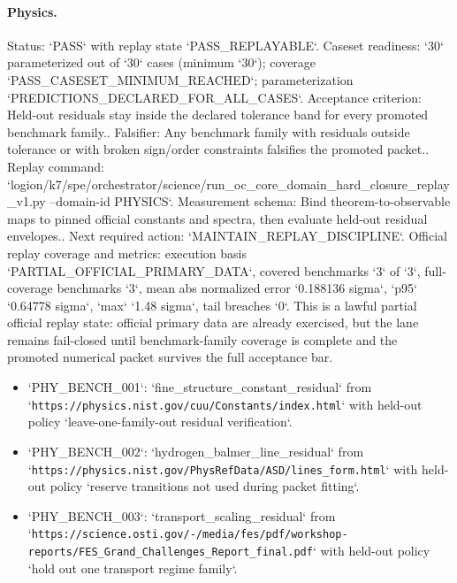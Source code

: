 \paragraph{Physics.}
Status: `PASS` with replay state `PASS\_REPLAYABLE`.
Caseset readiness: `30` parameterized out of `30` cases (minimum `30`); coverage `PASS\_CASESET\_MINIMUM\_REACHED`; parameterization `PREDICTIONS\_DECLARED\_FOR\_ALL\_CASES`.
Acceptance criterion: Held-out residuals stay inside the declared tolerance band for every promoted benchmark family..
Falsifier: Any benchmark family with residuals outside tolerance or with broken sign/order constraints falsifies the promoted packet..
Replay command: `logion/k7/spe/orchestrator/science/run\_oc\_core\_domain\_hard\_closure\_replay\_v1.py --domain-id PHYSICS`.
Measurement schema: Bind theorem-to-observable maps to pinned official constants and spectra, then evaluate held-out residual envelopes..
Next required action: `MAINTAIN\_REPLAY\_DISCIPLINE`.
Official replay coverage and metrics: execution basis `PARTIAL\_OFFICIAL\_PRIMARY\_DATA`, covered benchmarks `3` of `3`, full-coverage benchmarks `3`, mean abs normalized error `0.188136 sigma`, `p95` `0.64778 sigma`, `max` `1.48 sigma`, tail breaches `0`.
This is a lawful partial official replay state: official primary data are already exercised, but the lane remains fail-closed until benchmark-family coverage is complete and the promoted numerical packet survives the full acceptance bar.
\begin{itemize}
\item `PHY\_BENCH\_001`: `fine\_structure\_constant\_residual` from `\texttt{https://physics.nist.gov/cuu/Constants/index.html}` with held-out policy `leave-one-family-out residual verification`.
\item `PHY\_BENCH\_002`: `hydrogen\_balmer\_line\_residual` from `\texttt{https://physics.nist.gov/PhysRefData/ASD/lines\_form.html}` with held-out policy `reserve transitions not used during packet fitting`.
\item `PHY\_BENCH\_003`: `transport\_scaling\_residual` from `\texttt{https://science.osti.gov/-/media/fes/pdf/workshop-reports/FES\_Grand\_Challenges\_Report\_final.pdf}` with held-out policy `hold out one transport regime family`.
\end{itemize}


